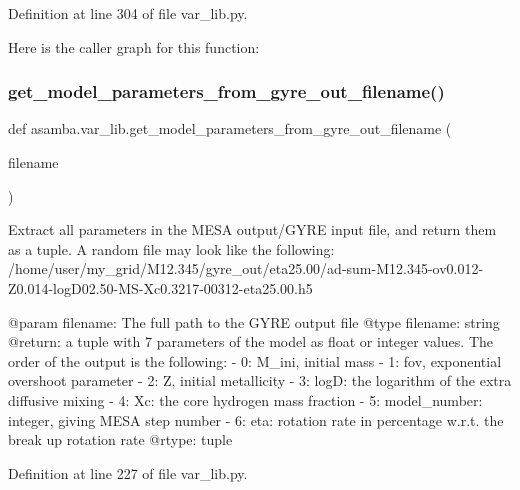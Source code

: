 Definition at line 304 of file var\+\_\+lib.\+py.

Here is the caller graph for this function\+:
\mbox{\label{namespaceasamba_1_1var__lib_a9ee4e5fb223a7df5e7795e850ab0cdcb}} 
\subsubsection{\texorpdfstring{get\+\_\+model\+\_\+parameters\+\_\+from\+\_\+gyre\+\_\+out\+\_\+filename()}{get\_model\_parameters\_from\_gyre\_out\_filename()}}
{\footnotesize\ttfamily def asamba.\+var\+\_\+lib.\+get\+\_\+model\+\_\+parameters\+\_\+from\+\_\+gyre\+\_\+out\+\_\+filename (\begin{DoxyParamCaption}\item[{}]{filename }\end{DoxyParamCaption})}

\begin{DoxyVerb}Extract all parameters in the MESA output/GYRE input file, and return them as a tuple. A random file
may look like the following:
/home/user/my_grid/M12.345/gyre_out/eta25.00/ad-sum-M12.345-ov0.012-Z0.014-logD02.50-MS-Xc0.3217-00312-eta25.00.h5

@param filename: The full path to the GYRE output file
@type filename: string
@return: a tuple with 7 parameters of the model as float or integer values. The order of the 
         output is the following:
         - 0: M_ini, initial mass
         - 1: fov, exponential overshoot parameter
         - 2: Z, initial metallicity
         - 3: logD: the logarithm of the extra diffusive mixing
         - 4: Xc: the core hydrogen mass fraction
         - 5: model_number: integer, giving MESA step number
         - 6: eta: rotation rate in percentage w.r.t. the break up rotation rate
@rtype: tuple
\end{DoxyVerb}
 

Definition at line 227 of file var\+\_\+lib.\+py.

\mbox{\label{namespaceasamba_1_1var__lib_af9d74851b62f321dbf694bd2ef8fa3ed}} 
